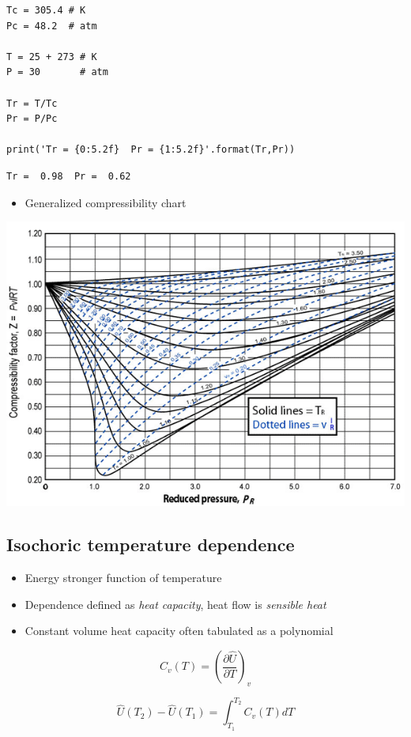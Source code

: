\documentclass[11pt]{article}
\begin{document}
\begin{verbatim}
Tc = 305.4 # K
Pc = 48.2  # atm

T = 25 + 273 # K
P = 30       # atm

Tr = T/Tc
Pr = P/Pc

print('Tr = {0:5.2f}  Pr = {1:5.2f}'.format(Tr,Pr))
\end{verbatim}

\begin{verbatim}
Tr =  0.98  Pr =  0.62
\end{verbatim}

\begin{itemize}
\item Generalized compressibility chart
\end{itemize}

\includegraphics[width=.9\linewidth]{./figs/compress.png}

\subsection{Isochoric temperature dependence}
\label{sec-10-3}
\begin{itemize}
\item Energy stronger function of temperature
\item Dependence defined as \emph{heat capacity}, heat flow is \emph{sensible heat}
\item Constant volume heat capacity often tabulated as a polynomial
\end{itemize}

\[ C_{v}(T) = \left ( \frac{\partial\hat{U}}{\partial T} \right )_{v} \]

\[ \hat{U}(T_{2}) - \hat{U}(T_{1}) = \int_{T_{1}}^{T_{2}}C_{v}(T) dT \]
\end{document}
